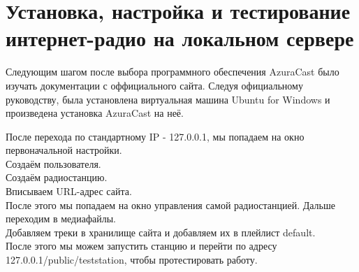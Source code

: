 \section{Установка, настройка и тестирование интернет-радио на локальном сервере}

Следующим шагом после выбора программного обеспечения AzuraCast было изучать документации с оффициального сайта. Следуя официальному руководству, была установлена виртуальная машина Ubuntu for Windows и произведена установка AzuraCast на неё.

После перехода по стандартному IP - 127.0.0.1, мы попадаем на окно первоначальной настройки. \\
Создаём пользователя. \\
Создаём радиостанцию. \\
Вписываем URL-адрес сайта. \\
После этого мы попадаем на окно управления самой радиостанцией. Дальше переходим в медиафайлы. \\
Добавляем треки в хранилище сайта и добавляем их в плейлист default. \\
После этого мы можем запустить станцию и перейти по адресу 127.0.0.1/public/teststation, чтобы протестировать работу.